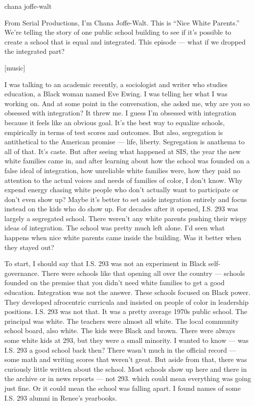 chana joffe-walt

From Serial Productions, I'm Chana Joffe-Walt. This is ``Nice White
Parents.'' We're telling the story of one public school building to see
if it's possible to create a school that is equal and integrated. This
episode --- what if we dropped the integrated part?

{[}music{]}

I was talking to an academic recently, a sociologist and writer who
studies education, a Black woman named Eve Ewing. I was telling her what
I was working on. And at some point in the conversation, she asked me,
why are you so obsessed with integration? It threw me. I guess I'm
obsessed with integration because it feels like an obvious goal. It's
the best way to equalize schools, empirically in terms of test scores
and outcomes. But also, segregation is antithetical to the American
promise --- life, liberty. Segregation is anathema to all of that. It's
caste. But after seeing what happened at SIS, the year the new white
families came in, and after learning about how the school was founded on
a false ideal of integration, how unreliable white families were, how
they paid no attention to the actual voices and needs of families of
color, I don't know. Why expend energy chasing white people who don't
actually want to participate or don't even show up? Maybe it's better to
set aside integration entirely and focus instead on the kids who do show
up. For decades after it opened, I.S. 293 was largely a segregated
school. There weren't any white parents pushing their wispy ideas of
integration. The school was pretty much left alone. I'd seen what
happens when nice white parents came inside the building. Was it better
when they stayed out?

To start, I should say that I.S. 293 was not an experiment in Black
self-governance. There were schools like that opening all over the
country --- schools founded on the premise that you didn't need white
families to get a good education. Integration was not the answer. These
schools focused on Black power. They developed afrocentric curricula and
insisted on people of color in leadership positions. I.S. 293 was not
that. It was a pretty average 1970s public school. The principal was
white. The teachers were almost all white. The local community school
board, also white. The kids were Black and brown. There were always some
white kids at 293, but they were a small minority. I wanted to know ---
was I.S. 293 a good school back then? There wasn't much in the official
record --- some math and writing scores that weren't great. But aside
from that, there was curiously little written about the school. Most
schools show up here and there in the archive or in news reports --- not
293. which could mean everything was going just fine. Or it could mean
the school was falling apart. I found names of some I.S. 293 alumni in
Renee's yearbooks.

